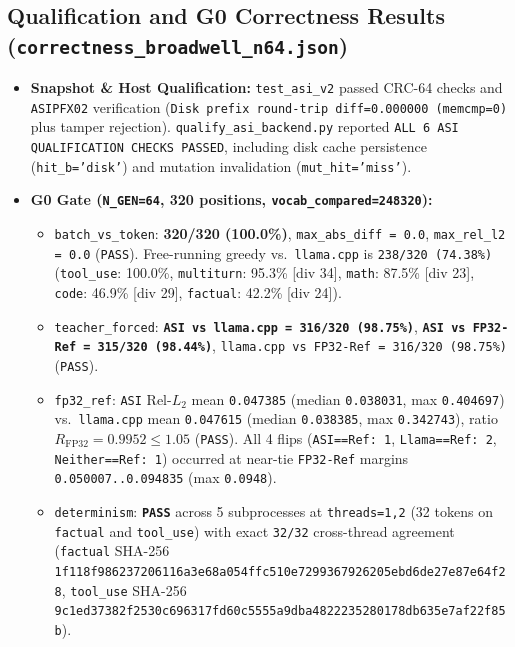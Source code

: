 \documentclass[11pt,a4paper]{article}
\begin{document}
\subsection{Qualification and G0 Correctness Results (\texttt{correctness\_broadwell\_n64.json})}
\begin{itemize}
    \item \textbf{Snapshot \& Host Qualification:} \texttt{test\_asi\_v2} passed CRC-64 checks and \texttt{ASIPFX02} verification (\texttt{Disk prefix round-trip diff=0.000000 (memcmp=0)} plus tamper rejection). \texttt{qualify\_asi\_backend.py} reported \texttt{ALL 6 ASI QUALIFICATION CHECKS PASSED}, including disk cache persistence (\texttt{hit\_b='disk'}) and mutation invalidation (\texttt{mut\_hit='miss'}).
    \item \textbf{G0 Gate (\texttt{N\_GEN=64}, 320 positions, \texttt{vocab\_compared=248320}):}
    \begin{itemize}
        \item \texttt{batch\_vs\_token}: \textbf{320/320 (100.0\%)}, \texttt{max\_abs\_diff = 0.0}, \texttt{max\_rel\_l2 = 0.0} (\texttt{PASS}). Free-running greedy vs.\ \texttt{llama.cpp} is \texttt{238/320 (74.38\%)} (\texttt{tool\_use}: 100.0\%, \texttt{multiturn}: 95.3\% [div 34], \texttt{math}: 87.5\% [div 23], \texttt{code}: 46.9\% [div 29], \texttt{factual}: 42.2\% [div 24]).
        \item \texttt{teacher\_forced}: \textbf{\texttt{ASI vs llama.cpp = 316/320 (98.75\%)}}, \textbf{\texttt{ASI vs FP32-Ref = 315/320 (98.44\%)}}, \texttt{llama.cpp vs FP32-Ref = 316/320 (98.75\%)} (\texttt{PASS}).
        \item \texttt{fp32\_ref}: \texttt{ASI} Rel-$L_2$ mean \texttt{0.047385} (median \texttt{0.038031}, max \texttt{0.404697}) vs.\ \texttt{llama.cpp} mean \texttt{0.047615} (median \texttt{0.038385}, max \texttt{0.342743}), ratio \textbf{$R_{\mathrm{FP32}} = 0.9952 \le 1.05$} (\texttt{PASS}). All 4 flips (\texttt{ASI==Ref: 1}, \texttt{Llama==Ref: 2}, \texttt{Neither==Ref: 1}) occurred at near-tie \texttt{FP32-Ref} margins \texttt{0.050007..0.094835} (max \texttt{0.0948}).
        \item \texttt{determinism}: \textbf{\texttt{PASS}} across 5 subprocesses at \texttt{threads=1,2} (32 tokens on \texttt{factual} and \texttt{tool\_use}) with exact \texttt{32/32} cross-thread agreement (\texttt{factual} SHA-256 \texttt{1f118f986237206116a3e68a054ffc510e7299367926205ebd6de27e87e64f28}, \texttt{tool\_use} SHA-256 \texttt{9c1ed37382f2530c696317fd60c5555a9dba4822235280178db635e7af22f85b}).
    \end{itemize}
\end{itemize}
\end{document}
